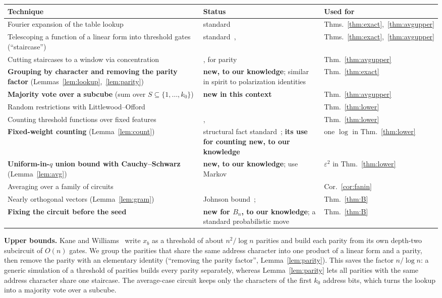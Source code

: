 \documentclass[11pt,letterpaper]{article}
\theoremstyle{remark}
\newcommand{\smalltitle}[1]{\textbf{\color{ink}#1}\quad}
\begin{document}
\begin{center}
\small
\renewcommand{\arraystretch}{1.25}
\begin{tabular}{@{}P{0.39\textwidth}P{0.33\textwidth}P{0.2\textwidth}@{}}
\toprule
Technique & Status & Used for\\
\midrule
Fourier expansion of the table lookup & standard & Thms.~\ref{thm:exact},~\ref{thm:avgupper}\\
Telescoping a function of a linear form into threshold gates (``staircase'') & standard~\cite[Prop.~1]{HMPST}, \cite{HP} & Thms.~\ref{thm:exact},~\ref{thm:avgupper}\\
Cutting staircases to a window via concentration & \cite[Thm.~1.4]{KW}, for parity & Thm.~\ref{thm:avgupper}\\
\textbf{Grouping by character and removing the parity factor} (Lemmas~\ref{lem:lookup},~\ref{lem:parity}) & \textbf{new, to our knowledge}; similar in spirit to polarization identities & Thm.~\ref{thm:exact}\\
\textbf{Majority vote over a subcube} (sum over $S\subseteq\{1,\dots,k_0\}$) & \textbf{new in this context} & Thm.~\ref{thm:avgupper}\\
Random restrictions with Littlewood--Offord & \cite[Lemmas~1.1, 3.1]{KW} & Thm.~\ref{thm:lower}\\
Counting threshold functions over fixed features & \cite{RSO}, \cite[Thm.~2.3]{KW} & Thm.~\ref{thm:lower}\\
\textbf{Fixed-weight counting} (Lemma~\ref{lem:count}) & structural fact standard~\cite{KW,CSS}; \textbf{its use for counting new, to our knowledge} & one $\log$ in Thm.~\ref{thm:lower}\\
\textbf{Uniform-in-$q$ union bound with Cauchy--Schwarz} (Lemma~\ref{lem:avg}) & \textbf{new, to our knowledge}; \cite{KW,KKL,CSS} use Markov & $\varepsilon^2$ in Thm.~\ref{thm:lower}\\
Averaging over a family of circuits & \cite[Cor.~1.1]{KW} & Cor.~\ref{cor:fanin}\\
Nearly orthogonal vectors (Lemma~\ref{lem:gram}) & Johnson bound~\cite{Gur}; \cite[Lemma~6.1]{KW} & Thm.~\ref{thm:B}\\
\textbf{Fixing the circuit before the seed} & \textbf{new for $B_n$, to our knowledge}; a standard probabilistic move & Thm.~\ref{thm:B}\\
\bottomrule
\end{tabular}
\end{center}

\smalltitle{Upper bounds.}
Kane and Williams~\cite[Thm.~1.2]{KW} write $x_b$ as a threshold of about
$n^2/\log n$ parities and build each parity from its own depth-two
subcircuit of $O(n)$ gates. We group the parities that share the same
address character into one product of a linear form and a parity, then
remove the parity with an elementary identity (``removing the parity
factor'', Lemma~\ref{lem:parity}). This saves the factor $n/\log n$: a
generic simulation of a threshold of parities builds every parity separately,
whereas Lemma~\ref{lem:parity} lets all parities with the same address
character share one staircase. The average-case circuit keeps only the
characters of the first $k_0$ address bits, which turns the lookup into a
majority vote over a subcube.
\end{document}
